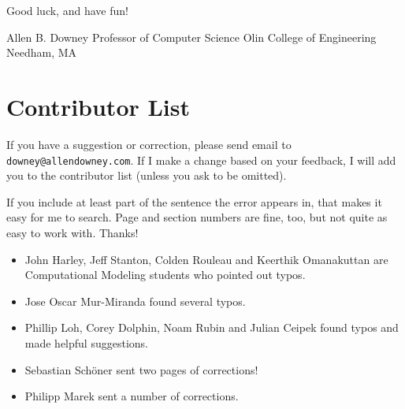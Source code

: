 \documentclass[12pt]{book}
\theoremstyle{exercise}
\begin{document}
Good luck, and have fun!


\begin{flushleft}
Allen B. Downey \newline
Professor of Computer Science \newline
Olin College of Engineering \newline
Needham, MA
\end{flushleft}


\section*{Contributor List}


If you have a suggestion or correction, please send email to
{\tt downey@allendowney.com}.  If I make a change based on your
feedback, I will add you to the contributor list
(unless you ask to be omitted).

If you include at least part of the sentence the
error appears in, that makes it easy for me to search.  Page and
section numbers are fine, too, but not quite as easy to work with.
Thanks!

\small

\begin{itemize}

\item John Harley, Jeff Stanton, Colden Rouleau and
Keerthik Omanakuttan are Computational Modeling students who
pointed out typos.

\item Jose Oscar Mur-Miranda found several typos.

\item Phillip Loh, Corey Dolphin, Noam Rubin and Julian Ceipek
found typos and made helpful suggestions.


\item Sebastian Sch\"{o}ner sent two pages of corrections!

\item Philipp Marek sent a number of corrections.



\end{itemize}
\end{document}
